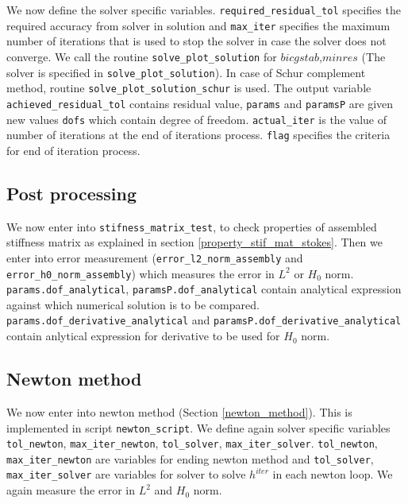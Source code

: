 \documentclass[a4paper]{book}
\begin{document}
We now define the solver specific variables. \verb|required_residual_tol| specifies the required accuracy from solver in solution and \verb|max_iter| specifies the maximum number of iterations that is used to stop the solver in case the solver does not converge. We call the routine \verb|solve_plot_solution| for $bicgstab$,$minres$ (The solver is specified in \verb|solve_plot_solution|). In case of Schur complement method, routine \verb|solve_plot_solution_schur| is used. The output variable \verb|achieved_residual_tol| contains residual value, \verb|params| and \verb|paramsP| are given new values \verb|dofs| which contain degree of freedom. \verb|actual_iter| is the value of number of iterations at the end of iterations process. \verb|flag| specifies the criteria for end of iteration process.\\

\subsection{Post processing}

We now enter into \verb|stifness_matrix_test|, to check properties of assembled stiffness matrix as explained in section \ref{property_stif_mat_stokes}. Then we enter into error measurement (\verb|error_l2_norm_assembly| and \verb|error_h0_norm_assembly|) which measures the error in $L^2$ or $H_0$ norm. \verb|params.dof_analytical|, \linebreak \verb|paramsP.dof_analytical| contain analytical expression against which numerical solution is to be compared. \verb|params.dof_derivative_analytical| and \verb|paramsP.dof_derivative_analytical| contain anlytical expression for derivative to be used for $H_0$ norm.\\

\subsection{Newton method}

We now enter into newton method (Section \ref{newton_method}). This is implemented in script \verb|newton_script|. We define again solver specific variables \verb|tol_newton|, \verb|max_iter_newton|, \verb|tol_solver|, \verb|max_iter_solver|. \verb|tol_newton|, \linebreak \verb|max_iter_newton| are variables for ending newton method and \verb|tol_solver|, \verb|max_iter_solver| are variables for solver to solve $h^{iter}$ in each newton loop. We again measure the error in $L^2$ and $H_0$ norm.\\
\end{document}
